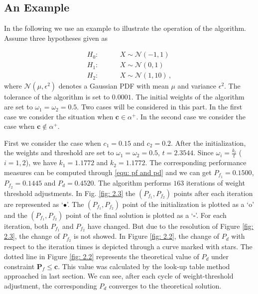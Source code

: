 \subsection{An Example}
In the following we use an example to illustrate the operation of the algorithm. Assume three hypotheses given as

\begin{equation}
\label{equ: Gaussian Hypothesis}
\begin{split}
	H_0:\;\;\;\;\;\;\;\;&X \sim \mathcal{N}(-1,1)\\
    H_1:\;\;\;\;\;\;\;\;&X \sim \mathcal{N}(0,1)\\
    H_2:\;\;\;\;\;\;\;\;&X \sim \mathcal{N}(1,10)\,,
\end{split}
\end{equation}
where $\mathcal{N}(\mu, \epsilon^2)$ denotes a Gaussian PDF with mean $\mu$ and variance $\epsilon^2$.
The tolerance of the algorithm is set to $0.0001$. The initial weights of the algorithm are set to $\omega_1 = \omega_2 = 0.5$. 
Two cases will be considered in this part. In the first case we consider the situation when $\mathbf{c} \in \alpha^+$. In the second case we consider the case when $\mathbf{c} \notin \alpha^+$.

First we consider the case when $c_1 = 0.15$ and $c_2 = 0.2$.
After the initialization, the weights and threshold are set to $\omega_1 = \omega_2 = 0.5$, $t =2.3544$. 
Since $\omega_i = \frac{k_i}{t}$ ($i = 1, 2$), we have $k_1 = 1.1772$ and $k_2 = 1.1772$. 
The corresponding performance measures can be computed through \eqref{equ: pf and pd} and we can get $P_{f_1}  = 0.1500$, $P_{f_2} = 0.1445$ and $P_d = 0.4520$. The algorithm performs $163$ iterations of weight threshold adjustments. In Fig. \ref{fig: 2.3} the $(P_{f_1}, P_{f_2})$  points after each iteration are represented as `$\bullet$'. 
The $(P_{f_1}, P_{f_2})$ point of the initialization is plotted as  a `o' and the $(P_{f_1}, P_{f_2})$ point of the final solution is plotted as a `$\square$'. For each iteration, both $P_{f_1}$ and $P_{f_2}$ have changed. But due to the resolution of Figure \ref{fig: 2.3}, the change of $P_{f_2}$ is not showed. 
In Figure \ref{fig: 2.2}, the change of $P_d$ with respect to the iteration times is depicted through a curve marked with stars.   
The dotted line in Figure \ref{fig: 2.2} represents the theoretical value of $P_d$ under constraint $\mathbf{P}_f \leq \mathbf{c}$. This value was calculated by the look-up table method approached in last section. We can see, after each cycle of weight-threshold adjustment, the corresponding $P_d$ converges to the theoretical solution. 


